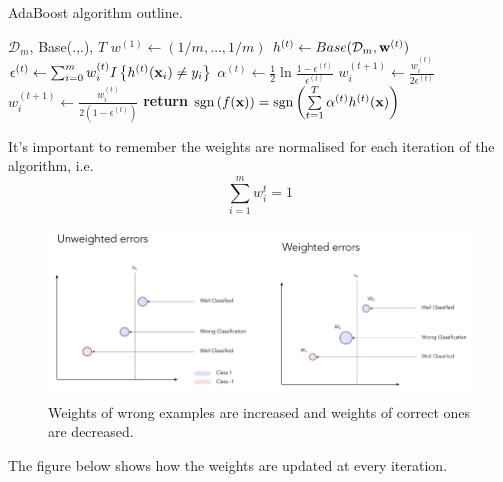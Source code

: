 \documentclass[a4paper]{article}
\begin{document}
\begin{algorithm}[H]
\caption{AdaBoost algorithm outline.}
\label{alg:hist_backproj}
\begin{algorithmic}[1]
 {$\mathcal{D}_m$, Base(.,.), $T$} 
\State $w^{(1)} \leftarrow (1/m, \ldots, 1/m)$ 
\State $h^{(t)} \leftarrow Base(\mathcal{D}_m,\textbf{w}^{(t)})$ 
\State $\epsilon^{(t)} \leftarrow \sum_{i=0}^{m}{w^{(t)}_i}I\left\{h^{(t)}(\textbf{x}_i)\neq y_i \right\}$ 
\State $\alpha^{(t)} \leftarrow \frac{1}{2}\ln{\frac{1-\epsilon^{(t)}}{\epsilon^{(t)}}}$
 
 
\State $w^{(t+1)}_i \leftarrow \frac{w_i^{(t)}}{2\epsilon^{(t)}}$ 
\Else {}
\State $w^{(t+1)}_i \leftarrow \frac{w_i^{(t)}}{2\left(1-\epsilon^{(t)}\right)}$ 
\EndIf
\EndFor
\EndFor
\State \textbf{return} $\textup{sgn}\left(f(\textbf{x})\right)=\textup{sgn}\left(\sum\limits^{T}_{t=1}\alpha^{(t)}h^{(t)}(\textbf{x})\right)$ 
\EndProcedure
\end{algorithmic}
\end{algorithm}
It's important to remember the weights are normalised for each iteration of the algorithm, i.e.
\begin{equation}
    \sum\limits_{i=1}^{m}w_i^{t}=1
\end{equation}
\begin{figure}[H]
    \centering
    \includegraphics[height=4.5cm]{img/ada_wrong_examples_weights.png}
    \caption{Weights of wrong examples are increased and weights of correct ones are decreased.}
\end{figure}
The figure below shows how the weights are updated at every iteration.
\end{document}
